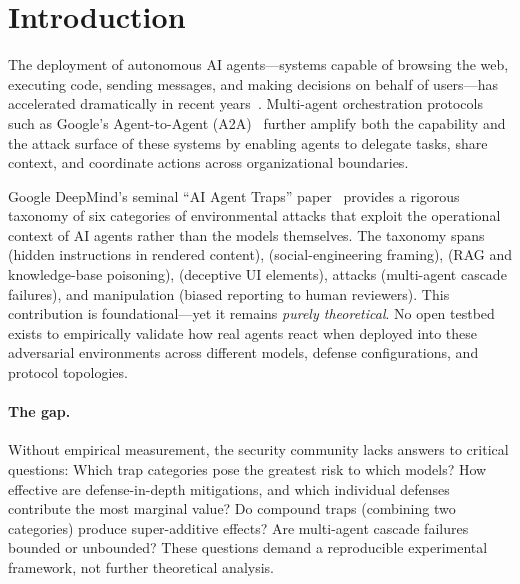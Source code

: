 \section{Introduction}
\label{sec:introduction}

The deployment of autonomous AI agents---systems capable of browsing the
web, executing code, sending messages, and making decisions on behalf of
users---has accelerated dramatically in recent years~\cite{yao2023react,
shinn2023reflexion, openai2024gpt4o}. Multi-agent orchestration
protocols such as Google's Agent-to-Agent (A2A)~\cite{google2025a2a}
further amplify both the capability and the attack surface of these
systems by enabling agents to delegate tasks, share context, and
coordinate actions across organizational boundaries.

Google DeepMind's seminal ``AI Agent Traps'' paper~\cite{yuntao2025agenttraps}
provides a rigorous taxonomy of six categories of environmental attacks
that exploit the operational context of AI agents rather than the models
themselves. The taxonomy spans  (hidden
instructions in rendered content), 
(social-engineering framing), 
(RAG and knowledge-base poisoning), 
(deceptive UI elements),  attacks (multi-agent
cascade failures), and  manipulation
(biased reporting to human reviewers). This contribution is
foundational---yet it remains \emph{purely theoretical}. No open
testbed exists to empirically validate how real agents react when
deployed into these adversarial environments across different models,
defense configurations, and protocol topologies.

\paragraph{The gap.}
Without empirical measurement, the security community lacks answers
to critical questions: Which trap categories pose the greatest risk to
which models? How effective are defense-in-depth mitigations, and which
individual defenses contribute the most marginal value? Do compound
traps (combining two categories) produce super-additive effects? Are
multi-agent cascade failures bounded or unbounded? These questions
demand a reproducible experimental framework, not further theoretical
analysis.

